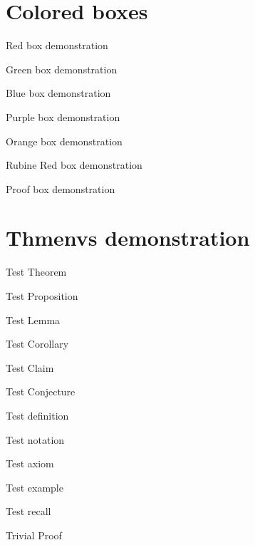 \documentclass{article}
\begin{document}
\section{Colored boxes}


\begin{redboxdemo}
    Red box demonstration
\end{redboxdemo}

\begin{greenboxdemo}
    Green box demonstration
\end{greenboxdemo}

\begin{blueboxdemo}
    Blue box demonstration
\end{blueboxdemo}

\begin{purpleboxdemo}
    Purple box demonstration
\end{purpleboxdemo}

\begin{orangeboxdemo}
    Orange box demonstration
\end{orangeboxdemo}

\begin{rubineredboxdemo}
    Rubine Red box demonstration
\end{rubineredboxdemo}

\begin{proofboxdemo}
    Proof box demonstration
\end{proofboxdemo}


\section{Thmenvs demonstration}

\begin{theorem}
Test Theorem
\end{theorem}
\begin{proposition}
Test Proposition
\end{proposition}
\begin{lemma}
Test Lemma
\end{lemma}
\begin{corollary}
Test Corollary
\end{corollary}
\begin{claim}
Test Claim
\end{claim}
\begin{conjecture}
Test Conjecture
\end{conjecture}

\begin{definition}
Test definition
\end{definition}
\begin{notation}
    Test notation
\end{notation}
\begin{axiom}
    Test axiom
\end{axiom}
\begin{example}
    Test example
\end{example}
\begin{recall}
    Test recall
\end{recall}

\begin{trivialproof}
    Trivial Proof
\end{trivialproof}
\end{document}
